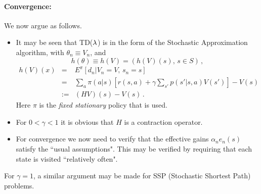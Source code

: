 \paragraph{Convergence:}

We now argue as follows.
\begin{itemize}
\item
It may be seen that TD($\lambda$) is in the form of the Stochastic
Approximation algorithm, with $\theta_n\equiv V_n$, and
$$
h(\theta)\equiv h(V) = (h(V)(s),\,s\in S)\,,
$$
\begin{eqnarray*}
h(V)(x) &=& E^\pi [d_n|V_n=V,\, s_n=s]\\
&=& \sum_a \pi(a|s)[r(s,a)+\gamma\sum_{s'} p(s'|s,a)V(s')]-V(s) \\
&:=& (HV)(s) -V(s) \,.
\end{eqnarray*}
Here $\pi$ is the {\em fixed stationary} policy that is used.
\item
For $0<\gamma<1$ it is obvious that $H$ is a contraction operator.
\item
For convergence we now need to verify  that the effective  gains
$\alpha_ne_n(s)$ satisfy the ``usual assumptions". This may be
verified by requiring that each state is visited ``relatively often".
\end{itemize}

For $\gamma=1$, a similar argument may be made for SSP (Stochastic Shortest Path)
problems.


%
%
%
%
%
%
%
%
%



